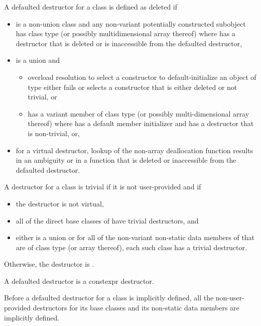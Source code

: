 \pnum
A defaulted destructor for a class
   is defined as deleted if
\begin{itemize}
\item {} is a non-union class and
  any non-variant potentially constructed subobject has class type
   (or possibly multidimensional array thereof) where
   has a destructor that is deleted or
  is inaccessible from the defaulted destructor,

\item
   is a union and
  \begin{itemize}
  \item
    overload resolution to select a constructor to
    default-initialize an object of type  either fails or
    selects a constructor that is either deleted or not trivial, or
  \item
     has a variant member  of
    class type  (or possibly multi-dimensional array thereof)
    where  has a default member initializer and
     has a destructor that is non-trivial, or,
  \end{itemize}

\item for a virtual destructor, lookup of the non-array deallocation
  function results in an ambiguity or in a function that is deleted or
  inaccessible from the defaulted destructor.
\end{itemize}

\pnum
A destructor for a class  is trivial if it is not user-provided and if
\begin{itemize}
\item the destructor is not virtual,

\item all of the direct base classes of  have trivial destructors, and

\item either  is a union or
for all of the non-variant non-static data members of  that are of class
type (or array thereof), each such class has a trivial destructor.
\end{itemize}

Otherwise, the destructor is
.

\pnum
A defaulted destructor is a constexpr destructor.

\pnum
Before a
defaulted destructor for a class is implicitly defined, all the non-user-provided
destructors for its base classes and its non-static data members are
implicitly defined.

